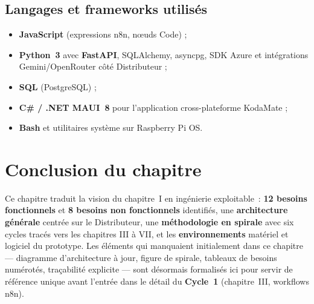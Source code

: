 \documentclass[a4paper,12pt]{report}
\begin{document}
	\subsection{Langages et frameworks utilisés}
	
	\begin{itemize}
		\item \textbf{JavaScript} (expressions n8n, nœuds Code) ;
		\item \textbf{Python~3} avec \textbf{FastAPI}, SQLAlchemy, asyncpg, SDK Azure et
		intégrations Gemini/OpenRouter côté Distributeur ;
		\item \textbf{SQL} (PostgreSQL) ;
		\item \textbf{C\# / .NET MAUI~8} pour l'application cross-plateforme KodaMate ;
		\item \textbf{Bash} et utilitaires système sur Raspberry Pi OS.
	\end{itemize}
	
	
	\section{Conclusion du chapitre}
	
	Ce chapitre traduit la vision du chapitre~I en ingénierie exploitable~:
	\textbf{12 besoins fonctionnels} et \textbf{8 besoins non fonctionnels} identifiés,
	une \textbf{architecture générale} centrée sur le Distributeur, une
	\textbf{méthodologie en spirale} avec six cycles tracés vers les chapitres III à
	VII, et les \textbf{environnements} matériel et logiciel du prototype. Les éléments
	qui manquaient initialement dans ce chapitre --- diagramme d'architecture à jour,
	figure de spirale, tableaux de besoins numérotés, traçabilité explicite --- sont
	désormais formalisés ici pour servir de référence unique avant l'entrée dans le
	détail du \textbf{Cycle~1} (chapitre~III, workflows n8n).
	
\end{document}
